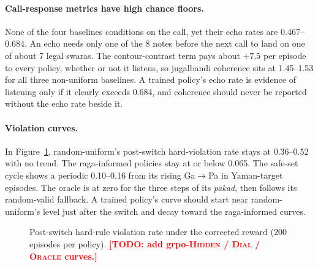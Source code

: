 \documentclass[11pt]{article}
\newcommand{\todo}[1]{\textcolor{red}{\textbf{[TODO: #1]}}}
\newcommand{\hidden}{\textsc{Hidden}}
\newcommand{\dial}{\textsc{Dial}}
\newcommand{\oracle}{\textsc{Oracle}}
\newcommand{\sw}[1]{\textit{#1}}  %
\begin{document}
\paragraph{Call-response metrics have high chance floors.} None of the four baselines conditions on the call, yet their echo rates are 0.467--0.684. An echo needs only one of the 8 notes before the next call to land on one of about 7 legal swaras. The contour-contrast term pays about $+7.5$ per episode to every policy, whether or not it listens, so jugalbandi coherence sits at 1.45--1.53 for all three non-uniform baselines. A trained policy's echo rate is evidence of listening only if it clearly exceeds 0.684, and coherence should never be reported without the echo rate beside it.

\paragraph{Violation curves.} In Figure~\ref{fig:decay}, random-uniform's post-switch hard-violation rate stays at 0.36--0.52 with no trend. The raga-informed policies stay at or below 0.065. The safe-set cycle shows a periodic 0.10--0.16 from its rising Ga$\to$Pa in Yaman-target episodes. The oracle is at zero for the three steps of its \sw{pakad}, then follows its random-valid fallback. A trained policy's curve should start near random-uniform's level just after the switch and decay toward the raga-informed curves.

\begin{figure}[t]
\centering
{}
\caption{Post-switch hard-rule violation rate under the corrected reward (200 episodes per policy). \todo{add grpo-\hidden{} / \dial{} / \oracle{} curves.}}
\label{fig:decay}
\end{figure}
\end{document}
